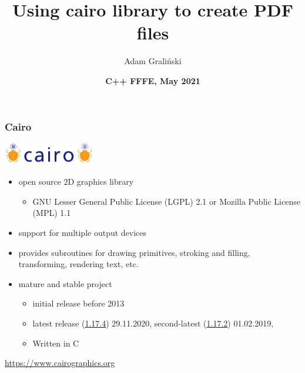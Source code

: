 \documentclass[aspectratio=169]{beamer}
\title[LTN07 :: cairographics]{Using cairo library to create PDF files}
\author{Adam Graliński}
\date[FFFE\_21]{\textbf{C++ {\color{red}F}{\color{blue}F}{\color{green}F}{\color{yellow}E}, May 2021}}
\newcommand{\greenemph}[1]{\textit{\textcolor{clGreen}{#1}}}
\begin{document}
{
\begin{frame}
\titlepage{}
\end{frame}
}

\begin{frame}
\frametitle{Cairo}
{\centering
\includegraphics[width=4cm,keepaspectratio]{pics/CairoLogo.png}
\begin{itemize}
  \item open source 2D graphics library
  \begin{itemize}
    \item GNU Lesser General Public License (LGPL) 2.1 or Mozilla Public License (MPL) 1.1
  \end{itemize}
  \item support for multiple output devices
  \item provides subroutines for drawing primitives, stroking and filling, transforming, rendering text, etc.
  \item mature and stable project
  \begin{itemize}
    \item initial release before 2013
    \item latest release (\href{https://www.cairographics.org/news/cairo-1.17.4/}{1.17.4}) 29.11.2020,
          second-latest (\href{https://www.cairographics.org/news/cairo-1.17.2/}{1.17.2}) 01.02.2019,
  \item Written in C
  \end{itemize}
\end{itemize}
\hspace{4cm} \url{https://www.cairographics.org}
}
\end{frame}
\end{document}
